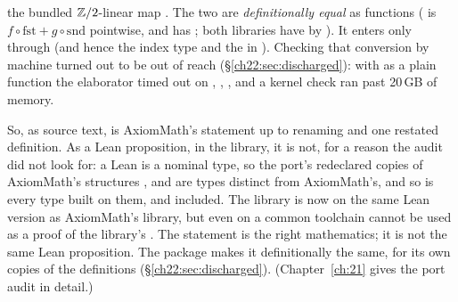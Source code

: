 \begin{dictionary}
\begin{itemize}
  the bundled ${\mathbb{Z}}/2$-linear map .  The two are
  \emph{definitionally equal} as functions ( is $f\circ\mathrm{fst}+g\circ\mathrm{snd}$ pointwise,
  and  has ; both libraries have  by ).  It enters only through
   (and hence the index type  and the  in ).  Checking that
  conversion by machine turned out to be out of reach (\S\ref{ch22:sec:discharged}): with  as a plain function
  the elaborator timed out on , , , and a kernel check ran past 20\,GB of memory.
\end{itemize}
So, as source text,  is AxiomMath's statement up to renaming and one restated definition.  As a Lean
proposition, in the library, it is not, for a reason the audit did not look for: a Lean  is a nominal type,
so the port's redeclared copies of AxiomMath's structures ,  and  are types distinct
from AxiomMath's, and so is every type built on them,  and  included.  The library is now on the
same Lean version as AxiomMath's library, but even on a common toolchain  cannot be used as a proof of
the library's .  The statement is the right mathematics; it is not the same Lean proposition.  The package
 makes it definitionally the same, for its own copies of the definitions
(\S\ref{ch22:sec:discharged}).  (Chapter~\ref{ch:21} gives the port audit in detail.)


\end{dictionary}
